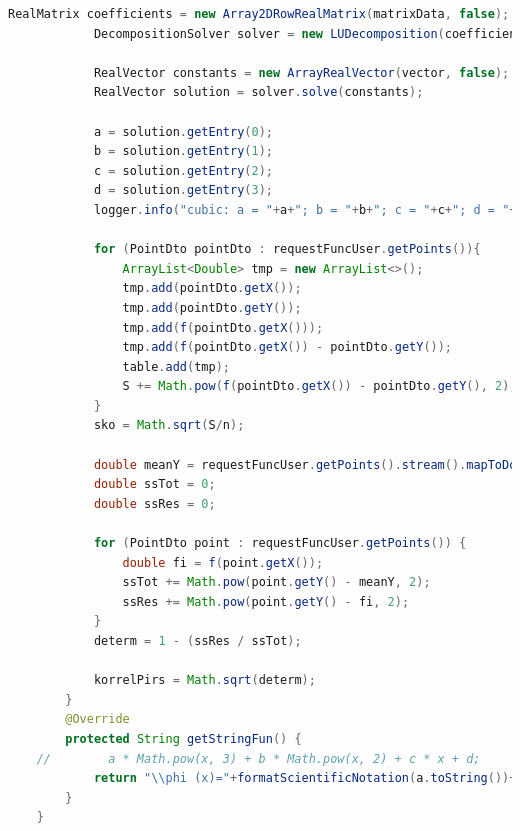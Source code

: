 \documentclass{article}
\begin{document}
\begin{lstlisting}[language=Java, caption={Кубическая аппроксимация}]
            RealMatrix coefficients = new Array2DRowRealMatrix(matrixData, false);
            DecompositionSolver solver = new LUDecomposition(coefficients).getSolver();
    
            RealVector constants = new ArrayRealVector(vector, false);
            RealVector solution = solver.solve(constants);
    
            a = solution.getEntry(0);
            b = solution.getEntry(1);
            c = solution.getEntry(2);
            d = solution.getEntry(3);
            logger.info("cubic: a = "+a+"; b = "+b+"; c = "+c+"; d = "+d);
    
            for (PointDto pointDto : requestFuncUser.getPoints()){
                ArrayList<Double> tmp = new ArrayList<>();
                tmp.add(pointDto.getX());
                tmp.add(pointDto.getY());
                tmp.add(f(pointDto.getX()));
                tmp.add(f(pointDto.getX()) - pointDto.getY());
                table.add(tmp);
                S += Math.pow(f(pointDto.getX()) - pointDto.getY(), 2);
            }
            sko = Math.sqrt(S/n);
    
            double meanY = requestFuncUser.getPoints().stream().mapToDouble(PointDto::getY).average().orElse(0);
            double ssTot = 0;
            double ssRes = 0;
    
            for (PointDto point : requestFuncUser.getPoints()) {
                double fi = f(point.getX());
                ssTot += Math.pow(point.getY() - meanY, 2);
                ssRes += Math.pow(point.getY() - fi, 2);
            }
            determ = 1 - (ssRes / ssTot);
    
            korrelPirs = Math.sqrt(determ);
        }
        @Override
        protected String getStringFun() {
    //        a * Math.pow(x, 3) + b * Math.pow(x, 2) + c * x + d;
            return "\\phi (x)="+formatScientificNotation(a.toString())+"\\cdot x^3 +"+formatScientificNotation(b.toString())+"\\cdot x^2+"+formatScientificNotation(c.toString())+"\\cdot x +"+formatScientificNotation(d.toString());
        }
    }
    
\end{lstlisting}
\end{document}
